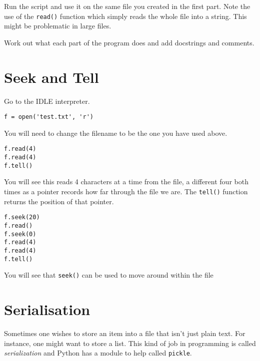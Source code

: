 \documentclass[12pt,oneside]{cttutorial}
\begin{document}
Run the script and use it on the same file you created in the first part. Note the use of the \lstinline!read()! function which simply reads the whole file into a string. This might be problematic in large files.

Work out what each part of the program does and add docstrings and comments.

\section{Seek and Tell}

Go to the IDLE interpreter.

\begin{lstlisting}
f = open('test.txt', 'r')
\end{lstlisting}

You will need to change the filename to be the one you have used above.

\begin{lstlisting}
f.read(4)
f.read(4)
f.tell()
\end{lstlisting}

You will see this reads 4 characters at a time from the file, a different four both times as a pointer records how far through the file we are. The \lstinline!tell()! function returns the position of that pointer.

\begin{lstlisting}
f.seek(20)
f.read()
f.seek(0)
f.read(4)
f.read(4)
f.tell()
\end{lstlisting}

You will see that \lstinline!seek()! can be used to move around within the file

\section{Serialisation}

Sometimes one wishes to store an item into a file that isn't just plain text. For instance, one might want to store a list. This kind of job in programming is called \emph{serialization} and Python has a module to help called \lstinline!pickle!.
\end{document}

